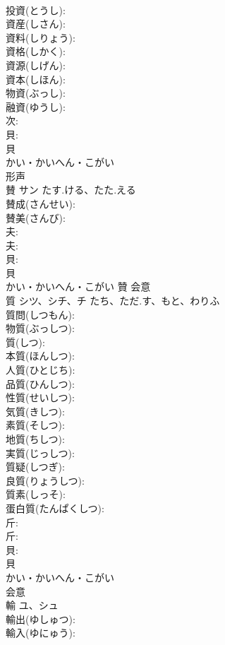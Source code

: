 \documentclass[8pt]{extreport}
\begin{document}
\begin{CJK}{UTF8}{min}
\\	投資(とうし): 
\\	資産(しさん): 
\\	資料(しりょう): 
\\	資格(しかく): 
\\	資源(しげん): 
\\	資本(しほん): 
\\	物資(ぶっし): 
\\	融資(ゆうし): 
\\	次: 
\\	貝: 
\\	貝	
\\	かい・かいへん・こがい	
\\	形声 
\\	賛	サン	たす.ける、たた.える		
\\	賛成(さんせい): 
\\	賛美(さんび): 
\\	夫: 
\\	夫: 
\\	貝: 
\\	貝	
\\	かい・かいへん・こがい	贊	会意 
\\	質	シツ、シチ、チ	たち、ただ.す、もと、わりふ		
\\	質問(しつもん): 
\\	物質(ぶっしつ): 
\\	質(しつ): 
\\	本質(ほんしつ): 
\\	人質(ひとじち): 
\\	品質(ひんしつ): 
\\	性質(せいしつ): 
\\	気質(きしつ): 
\\	素質(そしつ): 
\\	地質(ちしつ): 
\\	実質(じっしつ): 
\\	質疑(しつぎ): 
\\	良質(りょうしつ): 
\\	質素(しっそ): 
\\	蛋白質(たんぱくしつ): 
\\	斤: 
\\	斤: 
\\	貝: 
\\	貝	
\\	かい・かいへん・こがい	
\\	会意 
\\	輸	ユ、シュ			
\\	輸出(ゆしゅつ): 
\\	輸入(ゆにゅう): 

\end{CJK}
\end{document}
